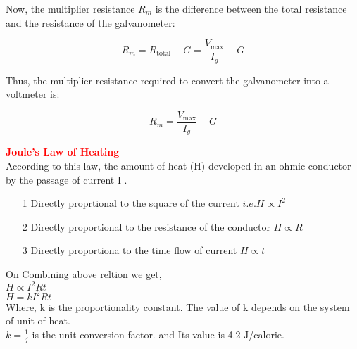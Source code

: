 \documentclass{beamer}
\begin{document}
\begin{frame}
Now, the multiplier resistance \( R_m \) is the difference between the total resistance and the resistance of the galvanometer:

\[
R_m = R_{\text{total}} - G = \frac{V_{\text{max}}}{I_g} - G
\]

Thus, the multiplier resistance required to convert the galvanometer into a voltmeter is:

\[
R_m = \frac{V_{\text{max}}}{I_g} - G
\]
\end{frame}



\begin{frame}
\textcolor{red}{\textbf{Joule's Law of Heating}}\\
According to this law, the amount of heat (H) developed in an ohmic conductor by the passage of current I .\\
\begin{itemize}
\item[1] Directly proprtional to the square of the current $i.e. H\propto I^2$
\item[2] Directly proportional to the resistance of the conductor $H\propto R$
\item[3] Directly proportiona to the time flow of current $H\propto t$
\end{itemize}
On Combining above reltion we get,\\
\hspace{2cm} $H\propto I^2Rt$\\
\hspace{2cm} $H=kI^2Rt$\\
Where, k is the proportionality constant. The value of k depends on the system of unit of heat.\\
$k=\frac{1}{j}$ is the unit conversion factor. and Its value is 4.2 J/calorie.
\end{frame}
\end{document}
